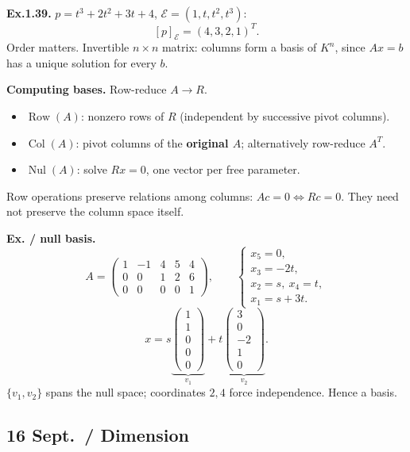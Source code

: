 \documentclass[11pt,letterpaper]{article}
\newcommand{\tightlist}{\setlength{\itemsep}{0pt}\setlength{\parskip}{0pt}}
\begin{document}
\textbf{Ex.1.39.} \(p=t^3+2t^2+3t+4\), \(\mathcal E=(1,t,t^2,t^3)\): \[
[p]_{\mathcal E}=(4,3,2,1)^T.
\] Order matters. Invertible \(n\times n\) matrix: columns form a basis
of \(K^n\), since \(Ax=b\) has a unique solution for every \(b\).

\textbf{Computing bases.} Row-reduce \(A\to R\).

\begin{itemize}
\tightlist
\item
  \(\operatorname{Row}(A)\): nonzero rows of \(R\) (independent by
  successive pivot columns).
\item
  \(\operatorname{Col}(A)\): pivot columns of the \textbf{original
  \(A\)}; alternatively row-reduce \(A^T\).
\item
  \(\operatorname{Nul}(A)\): solve \(Rx=0\), one vector per free
  parameter.
\end{itemize}

Row operations preserve relations among columns: \(Ac=0\iff Rc=0\). They
need not preserve the column space itself.

\textbf{Ex. / null basis.} \[
A=\begin{pmatrix}1&-1&4&5&4\\0&0&1&2&6\\0&0&0&0&1\end{pmatrix},\qquad
\begin{cases}x_5=0,\\x_3=-2t,\\x_2=s,\ x_4=t,\\x_1=s+3t.\end{cases}
\] \[
x=s\underbrace{\begin{pmatrix}1\\1\\0\\0\\0\end{pmatrix}}_{v_1}
+t\underbrace{\begin{pmatrix}3\\0\\-2\\1\\0\end{pmatrix}}_{v_2}.
\] \(\{v_1,v_2\}\) spans the null space; coordinates \(2,4\) force
independence. Hence a basis.

\newpage

\subsection{16 Sept.~/ Dimension}\label{sept.-dimension}
\end{document}
